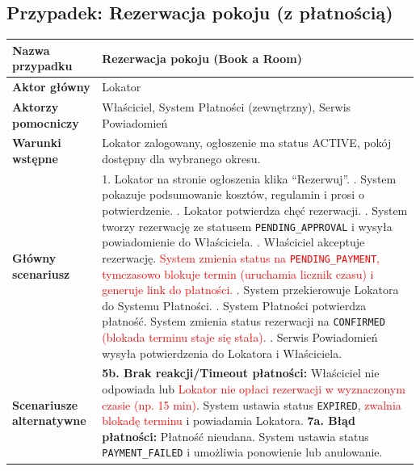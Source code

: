 \documentclass[11pt, a4paper]{article}
\begin{document}
\subsection{Przypadek: Rezerwacja pokoju (z płatnością)}
\begin{longtable}{|p{4cm}|p{10cm}|}
\hline
\textbf{Nazwa przypadku} & \textbf{Rezerwacja pokoju (Book a Room)} \\ \hline
\textbf{Aktor główny} & Lokator \\ \hline
\textbf{Aktorzy pomocniczy} & Właściciel, System Płatności (zewnętrzny), Serwis Powiadomień \\ \hline
\textbf{Warunki wstępne} & Lokator zalogowany, ogłoszenie ma status ACTIVE, pokój dostępny dla wybranego okresu. \\ \hline
\textbf{Główny scenariusz} &
1. Lokator na stronie ogłoszenia klika ``Rezerwuj''. \newline
2. System pokazuje podsumowanie kosztów, regulamin i prosi o potwierdzenie. \newline
3. Lokator potwierdza chęć rezerwacji. \newline
4. System tworzy rezerwację ze statusem \texttt{PENDING\_APPROVAL} i wysyła powiadomienie do Właściciela. \newline
5. Właściciel akceptuje rezerwację. \textcolor{red}{System zmienia status na \texttt{PENDING\_PAYMENT}, tymczasowo blokuje termin (uruchamia licznik czasu) i generuje link do płatności.} \newline
6. System przekierowuje Lokatora do Systemu Płatności. \newline
7. System Płatności potwierdza płatność. System zmienia status rezerwacji na \texttt{CONFIRMED} \textcolor{red}{(blokada terminu staje się stała).} \newline
8. Serwis Powiadomień wysyła potwierdzenia do Lokatora i Właściciela.
\\ \hline
\textbf{Scenariusze alternatywne} &
\textbf{5b. Brak reakcji/Timeout płatności:} Właściciel nie odpowiada lub \textcolor{red}{Lokator nie opłaci rezerwacji w wyznaczonym czasie (np. 15 min)}. System ustawia status \texttt{EXPIRED}, \textcolor{red}{zwalnia blokadę terminu} i powiadamia Lokatora. \newline
\textbf{7a. Błąd płatności:} Płatność nieudana. System ustawia status \texttt{PAYMENT\_FAILED} i umożliwia ponowienie lub anulowanie.
\\ \hline
\end{longtable}
\end{document}
